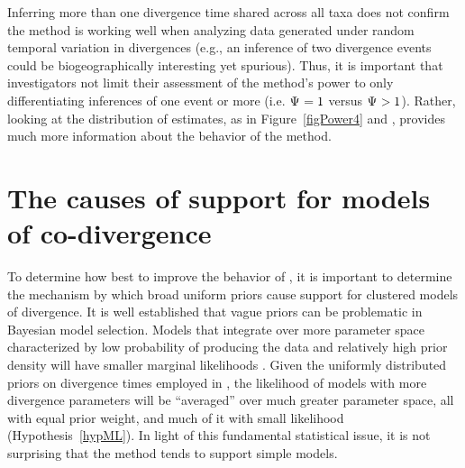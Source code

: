 Inferring more than one divergence time shared across all taxa does not confirm
the method is working well when analyzing data generated under random temporal
variation in divergences (e.g., an inference of two divergence events could be
biogeographically interesting yet spurious).
Thus, it is important that investigators not limit their assessment of the
method's power to only differentiating inferences of one event or more (i.e.
$\Psi_{} = 1$ versus $\Psi_{} > 1$).
Rather, looking at the distribution of estimates, as in Figure~\ref{figPower4}
and \citet{Oaks2012}, provides much more information about the behavior of the
method.


\section{The causes of support for models of co-divergence}
To determine how best to improve the behavior of \msb, it is important to
determine the mechanism by which broad uniform priors cause support for
clustered models of divergence.
It is well established that vague priors can be problematic in Bayesian model
selection.
Models that integrate over more parameter space characterized by low
probability of producing the data and relatively high prior density will have
smaller marginal likelihoods \citep{Jeffreys1939,Lindley1957}.
Given the uniformly distributed priors on divergence times employed in \msb,
the likelihood of models with more divergence parameters will be ``averaged''
over much greater parameter space, all with equal prior weight, and much of it
with small likelihood (Hypothesis~\ref{hypML}).
In light of this fundamental statistical issue, it is not surprising that the
method tends to support simple models.

